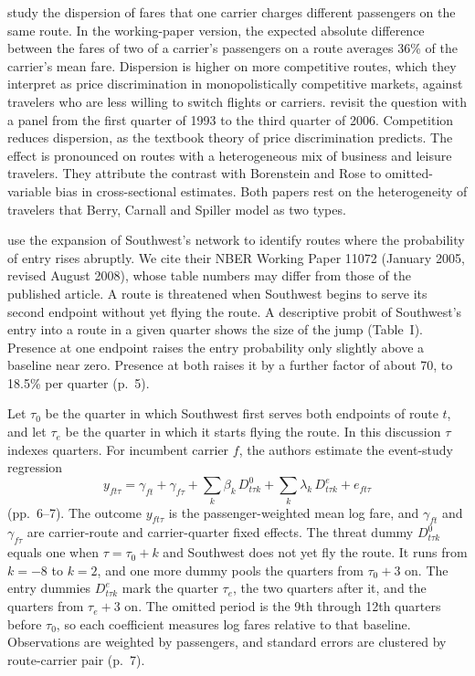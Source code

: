 \citet{BorensteinRose1994} study the dispersion of fares that one carrier charges different passengers on the
same route. In the working-paper version, the expected absolute difference between the fares of two of a
carrier's passengers on a route averages 36\% of the carrier's mean fare. Dispersion is higher on more
competitive routes, which they interpret as price discrimination in monopolistically competitive markets,
against travelers who are less willing to switch flights or carriers. \citet{GerardiShapiro2009} revisit
the question with a panel from the first quarter of 1993 to the third quarter of 2006. Competition reduces
dispersion, as the textbook theory of price discrimination predicts. The effect is pronounced on routes with a
heterogeneous mix of business and leisure travelers. They attribute the contrast with Borenstein and Rose to
omitted-variable bias in cross-sectional estimates. Both papers rest on the heterogeneity of travelers that
Berry, Carnall and Spiller model as two types.

\citet{GoolsbeeSyverson2008} use the expansion of Southwest's network to identify routes where the probability
of entry rises abruptly. We cite their NBER Working Paper 11072 (January 2005, revised August 2008), whose
table numbers may differ from those of the published article. A route is threatened when Southwest begins to
serve its second endpoint without yet flying the route. A descriptive probit of Southwest's entry into a route
in a given quarter shows the size of the jump (Table~I). Presence at one endpoint raises the entry probability
only slightly above a baseline near zero. Presence at both raises it by a further factor of about 70, to
18.5\% per quarter (p.~5).

Let $\tau_0$ be the quarter in which Southwest first serves both endpoints of route $t$, and let $\tau_e$ be
the quarter in which it starts flying the route. In this discussion $\tau$ indexes quarters. For incumbent
carrier $f$, the authors estimate the event-study regression
\begin{equation}\label{eq:09-gs}
  y_{ft\tau} = \gamma_{ft} + \gamma_{f\tau} + \sum_{k} \beta_k\,D^{0}_{t\tau k}
  + \sum_{k} \lambda_k\,D^{e}_{t\tau k} + e_{ft\tau}
\end{equation}
(pp.~6--7). The outcome $y_{ft\tau}$ is the passenger-weighted mean log fare, and $\gamma_{ft}$ and
$\gamma_{f\tau}$ are carrier-route and carrier-quarter fixed effects. The threat dummy $D^{0}_{t\tau k}$
equals one when $\tau = \tau_0 + k$ and Southwest does not yet fly the route. It runs from $k = -8$ to
$k = 2$, and one more dummy pools the quarters from $\tau_0 + 3$ on. The entry dummies $D^{e}_{t\tau k}$
mark the quarter $\tau_e$, the two quarters after it, and the quarters from $\tau_e + 3$ on. The omitted
period is the 9th through 12th quarters before $\tau_0$, so each coefficient measures log fares relative to
that baseline. Observations are weighted by passengers, and standard errors are clustered by route-carrier
pair (p.~7).

